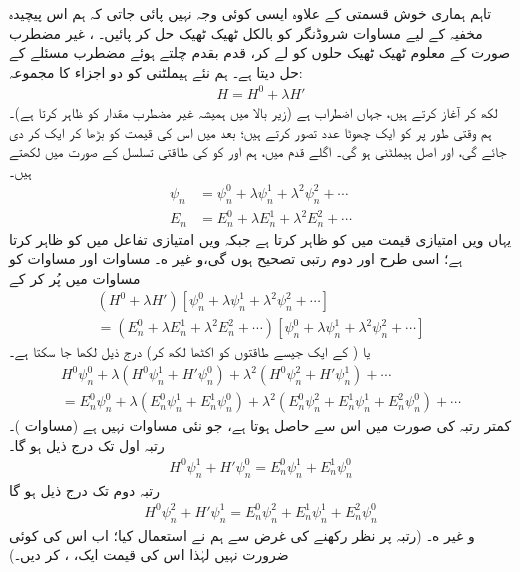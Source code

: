 تاہم ہماری خوش قسمتی کے علاوہ ایسی کوئی وجہ نہیں پائی جاتی کہ ہم اس پیچیدہ مخفیہ کے لیے مساوات شروڈنگر کو بالکل ٹھیک ٹھیک حل کر پائیں۔ ، غیر مضطرب صورت کے معلوم ٹھیک ٹھیک حلوں کو لے کر، قدم بقدم چلتے ہوئے مضطرب مسئلے کے  حل دیتا ہے۔ ہم نئے ہیملٹنی کو دو اجزاء کا مجموعہ:
\begin{align}
H = H^0 + \lambda H'
\end{align}
 لکھ کر آغاز کرتے ہیں، جہاں  اضطراب ہے (زیر بالا میں  ہمیشہ غیر مضطرب مقدار کو ظاہر کرتا ہے)۔ ہم وقتی طور پر  کو ایک چھوٹا عدد تصور کرتے ہیں؛ بعد میں اس کی قیمت کو بڑھا کر ایک  کر دی جائے گی، اور  اصل ہیملٹنی ہو گی۔ اگلے قدم میں، ہم  اور  کو  کی طاقتی تسلسل کے صورت میں لکھتے ہیں۔
\begin{align}
\psi_n &= \psi_n^0 + \lambda\psi_n^1 + \lambda^2\psi_n^2+\cdots \label{مساوات_اضطراب_سائے_این}\\
E_n &= E_n^0 + \lambda E_n^1 + \lambda^2 E_n^2+\cdots \label{مساوات_اضطراب_ای_این}
\end{align} 
یہاں  ویں امتیازی  قیمت میں  کو  ظاہر کرتا ہے جبکہ  ویں امتیازی تفاعل میں  کو  ظاہر کرتا ہے؛ اسی طرح  اور  دوم رتبی تصحیح ہوں گی،و غیر ه۔ مساوات  اور مساوات  کو مساوات  میں پُر کر کے 
\begin{multline*}
(H^0 + \lambda H')[\psi_n^0 + \lambda \psi_n^1 + \lambda^2 \psi_n^2 + \cdots]\\
= (E_n^0 + \lambda E_n^1 + \lambda^2 E_n^2 + \cdots)[\psi_n^0 + \lambda \psi_n^1 + \lambda^2 \psi_n^2 + \cdots]
\end{multline*}
یا (  کے ایک جیسے طاقتوں کو اکٹھا لکھ کر) درج ذیل لکھا جا سکتا ہے۔
\begin{multline*}
H^0 \psi_n^0 + \lambda (H^0 \psi_n^1 + H' \psi_n^0) + \lambda^2 (H^0 \psi_n^2 + H' \psi_n^1) + \cdots \\
= E_n^0 \psi_n^0 + \lambda (E_n^0 \psi_n^1 + E_n^1 \psi_n^0) + \lambda^2 (E_n^0 \psi_n^2 + E_n^1 \psi_n^1 + E_n^2 \psi_n^0) + \cdots
\end{multline*}
 کمتر رتبہ  کی صورت میں اس سے  حاصل ہوتا ہے، جو نئی مساوات نہیں ہے (مساوات )۔ رتبہ اول  تک درج ذیل ہو گا۔
\begin{align}\label{مساوات_اضطراب_رتبہ_اول}
H^0 \psi_n^1 + H' \psi_n^0 = E_n^0 \psi_n^1 + E_n^1 \psi_n^0
\end{align}
رتبہ دوم  تک درج ذیل ہو گا 
\begin{align}\label{مساوات_اضطراب_رتبہ_دوم}
H^0 \psi_n^2 + H' \psi_n^1 = E_n^0 \psi_n^2 + E_n^1 \psi_n^1 + E_n^2 \psi_n^0
\end{align}
و غیر ه۔ (رتبہ پر نظر رکھنے کی غرض سے ہم نے  استعمال کیا؛ اب اس کی کوئی ضرورت نہیں لہٰذا اس کی قیمت ایک، ، کر دیں۔)


